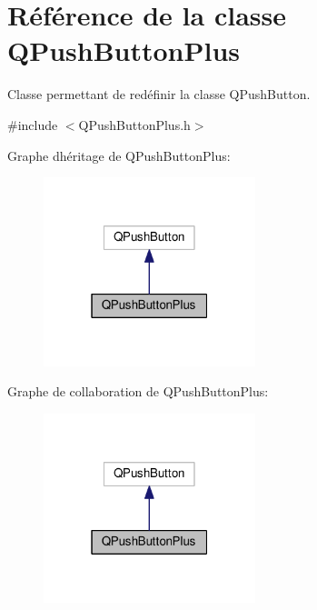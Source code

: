 \hypertarget{class_q_push_button_plus}{}\section{Référence de la classe Q\+Push\+Button\+Plus}
\label{class_q_push_button_plus}


Classe permettant de redéfinir la classe Q\+Push\+Button.  




{\ttfamily \#include $<$Q\+Push\+Button\+Plus.\+h$>$}



Graphe d\textquotesingle{}héritage de Q\+Push\+Button\+Plus\+:\nopagebreak
\begin{figure}[H]
\begin{center}
\leavevmode
\includegraphics[width=175pt]{class_q_push_button_plus__inherit__graph}
\end{center}
\end{figure}


Graphe de collaboration de Q\+Push\+Button\+Plus\+:\nopagebreak
\begin{figure}[H]
\begin{center}
\leavevmode
\includegraphics[width=175pt]{class_q_push_button_plus__coll__graph}
\end{center}
\end{figure}
